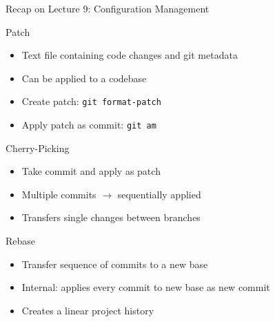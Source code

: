 \begin{frame}{Recap on Lecture 9: Configuration Management} %
	\begin{fancycolumns}[animation=none]
	{\small 
		\begin{definition}{Patch}
			\begin{itemize}
				\item Text file containing code changes and git metadata
				\item Can be applied to a codebase
				\item Create patch: \texttt{git format-patch}
				\item Apply patch as commit: \texttt{git am}
			\end{itemize}
		\end{definition}\pause
		\begin{definition}{Cherry-Picking}
			\begin{itemize}
				\item Take commit and apply as patch
				\item Multiple commits $\rightarrow$ sequentially applied
				\item Transfers single changes between branches
			\end{itemize}
		\end{definition}\pause
		\begin{definition}{Rebase}
			\begin{itemize}
				\item Transfer sequence of commits to a new base 
				\item Internal: applies every commit to new base as new commit
				\item Creates a linear project history
			\end{itemize}
		\end{definition}\pause
	}
	\nextcolumn
	\begin{center}
		

\end{center}
\end{fancycolumns}
\end{frame}
